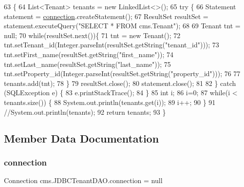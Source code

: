 \begin{DoxyCode}
63                                  \{
64         List<Tenant> tenants = \textcolor{keyword}{new} LinkedList<>();
65          \textcolor{keywordflow}{try} \{
66                 Statement statement = \mbox{\hyperlink{classcms_1_1_j_d_b_c_tenant_d_a_o_a08dc3f2801dc5348c6473632b342d62a}{connection}}.createStatement();
67                 ResultSet resultSet = statement.executeQuery(\textcolor{stringliteral}{"SELECT * FROM cms.Tenant"});
68                  
69                 Tenant tnt = null;
70                 \textcolor{keywordflow}{while}(resultSet.next())\{
71                     tnt = \textcolor{keyword}{new} Tenant();
72                     tnt.setTenant\_id(Integer.parseInt(resultSet.getString(\textcolor{stringliteral}{"tenant\_id"})));
73                     tnt.setFirst\_name(resultSet.getString(\textcolor{stringliteral}{"first\_name"}));
74                     tnt.setLast\_name(resultSet.getString(\textcolor{stringliteral}{"last\_name"}));
75                     tnt.setProperty\_id(Integer.parseInt(resultSet.getString(\textcolor{stringliteral}{"property\_id"})));
76                      
77                     tenants.add(tnt);
78                 \}
79                 resultSet.close();
80                 statement.close();
81                  
82             \} \textcolor{keywordflow}{catch} (SQLException e) \{
83                 e.printStackTrace();
84             \}
85             \textcolor{keywordtype}{int} i;
86             i=0;
87             \textcolor{keywordflow}{while}(i < tenants.size()) \{
88                     System.out.println(tenants.get(i));
89                     i++;
90              \}
91             \textcolor{comment}{//System.out.println(tenants);}
92             \textcolor{keywordflow}{return} tenants;
93     \}
\end{DoxyCode}


\subsection{Member Data Documentation}
\mbox{\label{classcms_1_1_j_d_b_c_tenant_d_a_o_a08dc3f2801dc5348c6473632b342d62a}} 
\subsubsection{\texorpdfstring{connection}{connection}}
{\footnotesize\ttfamily Connection cms.\+J\+D\+B\+C\+Tenant\+D\+A\+O.\+connection = null\hspace{0.3cm}{\ttfamily [package]}}

